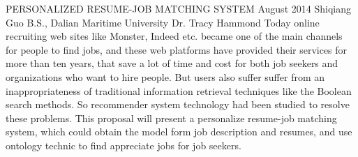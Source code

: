 \begingroup
\absone
{PERSONALIZED RESUME-JOB MATCHING SYSTEM}
{August 2014}
{Shiqiang Guo}
{B.S., Dalian Maritime University}  %
{Dr. Tracy Hammond}%
{
Today online recruiting web sites like Monster, Indeed etc. became one of the main channels for people to find jobs, and these web platforms have provided their services for more than ten years, that save a lot of time and cost for both job seekers and organizations who want to hire people. But users also suffer suffer  from  an inappropriateness  of  traditional  information  retrieval  techniques  like  the  Boolean  search  methods. So recommender system technology had been studied to resolve these problems.  This  proposal will  present  a  personalize resume-job matching system, which could obtain the model form job description and resumes, and use ontology technic to find appreciate jobs for job seekers.
}
\endgroup




